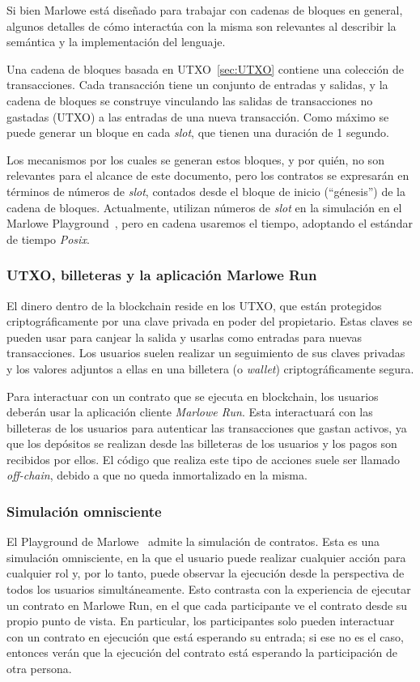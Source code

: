 \documentclass[12pt]{book}
\begin{document}
Si bien Marlowe está diseñado para trabajar con cadenas de bloques en general, algunos detalles de cómo interactúa con la misma son relevantes al describir la semántica y la implementación del lenguaje.

Una cadena de bloques basada en UTXO~\ref{sec:UTXO} contiene una colección de transacciones. Cada transacción tiene un conjunto de entradas y salidas, y la cadena de bloques se construye vinculando las salidas de transacciones no gastadas (UTXO) a las entradas de una nueva transacción. Como máximo se puede generar un bloque en cada \textit{slot}, que tienen una duración de 1 segundo.

Los mecanismos por los cuales se generan estos bloques, y por quién, no son relevantes para el alcance de este documento, pero los contratos se expresarán en términos de números de \textit{slot}, contados desde el bloque de inicio (``génesis'') de la cadena de bloques. Actualmente, utilizan números de \textit{slot} en la simulación en el Marlowe Playground~\cite{marlowe_playground}, pero en cadena usaremos el tiempo, adoptando el estándar de tiempo \textit{Posix}.

\subsubsection{UTXO, billeteras y la aplicación Marlowe Run}
El dinero dentro de la blockchain reside en los UTXO, que están protegidos criptográficamente por una clave privada en poder del propietario. Estas claves se pueden usar para canjear la salida y usarlas como entradas para nuevas transacciones. Los usuarios suelen realizar un seguimiento de sus claves privadas y los valores adjuntos a ellas en una billetera (o \textit{wallet}) criptográficamente segura.

Para interactuar con un contrato que se ejecuta en blockchain, los usuarios deberán usar la aplicación cliente \textit{Marlowe Run}. Esta interactuará con las billeteras de los usuarios para autenticar las transacciones que gastan activos, ya que los depósitos se realizan desde las billeteras de los usuarios y los pagos son recibidos por ellos. El código que realiza este tipo de acciones suele ser llamado \textit{off-chain}, debido a que no queda inmortalizado en la misma.

\subsubsection{Simulación omnisciente}
El Playground de Marlowe~\cite{marlowe_playground} admite la simulación de contratos. Esta es una simulación omnisciente, en la que el usuario puede realizar cualquier acción para cualquier rol y, por lo tanto, puede observar la ejecución desde la perspectiva de todos los usuarios simultáneamente. Esto contrasta con la experiencia de ejecutar un contrato en Marlowe Run, en el que cada participante ve el contrato desde su propio punto de vista. En particular, los participantes solo pueden interactuar con un contrato en ejecución que está esperando su entrada; si ese no es el caso, entonces verán que la ejecución del contrato está esperando la participación de otra persona.
\end{document}
